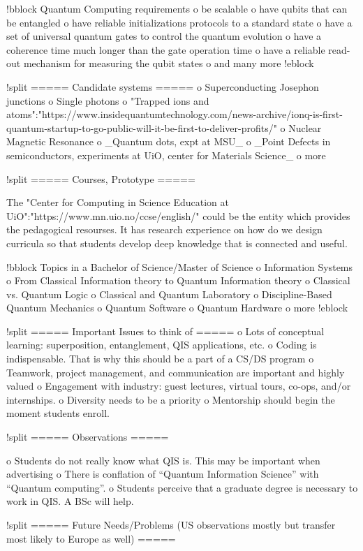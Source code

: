 \documentclass[oneside,final,10pt]{article}
\begin{document}
!bblock Quantum Computing requirements
o be scalable
o have qubits that can be entangled
o have reliable initializations protocols to a standard state
o have a set of universal quantum gates to control the quantum evolution
o have a coherence time much longer than the gate operation time
o have a reliable read-out mechanism for measuring the qubit states
o and many more 
!eblock

!split
===== Candidate systems =====
o Superconducting Josephon junctions
o Single photons
o "Trapped ions and atoms":"https://www.insidequantumtechnology.com/news-archive/ionq-is-first-quantum-startup-to-go-public-will-it-be-first-to-deliver-profits/"
o Nuclear Magnetic Resonance
o _Quantum dots, expt at MSU_
o _Point Defects in semiconductors, experiments at UiO, center for Materials Science_
o more


!split
===== Courses, Prototype =====

The "Center for Computing in Science Education at UiO":"https://www.mn.uio.no/ccse/english/" could be the entity which provides the pedagogical resourses. It has research experience
on how do we design curricula so that students develop deep knowledge that is connected and useful.

!bblock Topics  in a Bachelor of Science/Master of Science
o Information Systems 
o From Classical Information theory to Quantum Information theory
o Classical vs. Quantum Logic
o Classical and Quantum Laboratory 
o Discipline-Based Quantum Mechanics 
o Quantum Software
o Quantum Hardware
o more
!eblock

!split
===== Important Issues to think of =====
o Lots of conceptual learning: superposition, entanglement, QIS applications, etc.
o Coding is indispensable. That is why this should be a part of a CS/DS program
o Teamwork, project management, and communication are important and highly valued
o Engagement with industry: guest lectures, virtual tours, co-ops, and/or internships.
o Diversity needs to be a priority
o Mentorship should begin the moment students enroll.

!split
===== Observations =====

o Students do not really know what QIS is. This may be important when advertising
o There is conflation of “Quantum Information Science” with “Quantum computing”.
o Students perceive that a graduate degree is necessary to work in QIS. A BSc will help.

!split
===== Future Needs/Problems (US observations mostly but transfer most likely to Europe as well) =====
\end{document}
